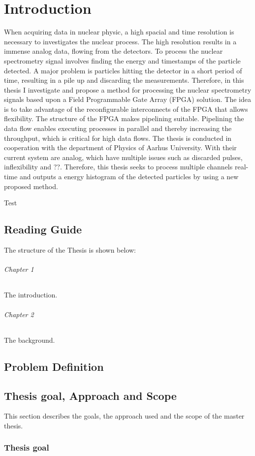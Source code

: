 \chapter{Introduction}
When acquiring data in nuclear physic, a high spacial and time resolution is necessary to investigates the nuclear process. 
The high resolution results in a immense analog data, flowing from the detectors. 
To process the nuclear spectrometry signal involves finding the energy and timestamps of the particle detected.
A major problem is particles hitting the detector in a short period of time, resulting in a pile up and discarding the measurements.\newline
Therefore, in this thesis I investigate and propose a method for processing the nuclear spectrometry signals based upon a Field Programmable Gate Array (FPGA) solution.
The idea is to take advantage of the reconfigurable interconnects of the FPGA that allows flexibility. The structure of the FPGA makes pipelining suitable. Pipelining the data flow enables executing processes in parallel and thereby increasing the throughput, which is critical for high data flows. 
\indent The thesis is conducted in cooperation with the department of Physics of Aarhus University.
With their current system are analog, which have multiple issues such as discarded pulses, inflexibility and ??.
Therefore, this thesis seeks to process multiple channels real-time and outputs a energy histogram of the detected particles by using a new proposed method.


Test\cite{LatexModulesLink} \cite{dummy2015}
\section{Reading Guide}
The structure of the Thesis is shown below:
\subparagraph{Chapter 1} The introduction. 
\subparagraph{Chapter 2} The background. 

\section{Problem Definition}

\section{Thesis goal, Approach and Scope}
This section describes the goals, the approach used and the scope of the master thesis.
\subsection{Thesis goal}

